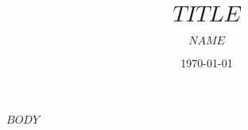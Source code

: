 \documentclass{beamer}
\title[$SHORTTITLE$]{$TITLE$} %
\author{$NAME$} %
\institute[$INSTITUTE$] %
{
$INSTITUTE$ \\ %
\medskip
\textit{$EMAIL$} %
}
\date{\today} %
\begin{document}
\begin{frame}
\titlepage
\end{frame}


$BODY$
\end{document}
